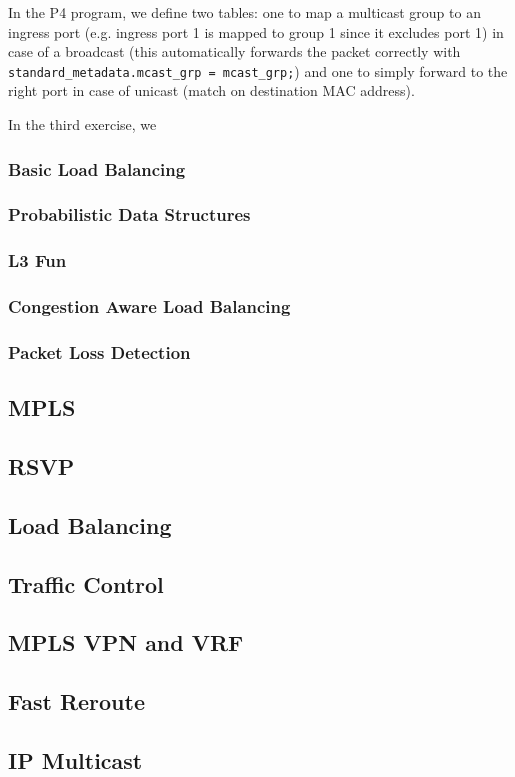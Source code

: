 In the P4 program, we define two tables: one to map a multicast group to an ingress port (e.g. ingress port 1 is mapped to group 1 since it excludes port 1) in case of a broadcast (this automatically forwards the packet correctly with \texttt{standard\_metadata.mcast\_grp = mcast\_grp;}) and one to simply forward to the right port in case of unicast (match on destination MAC address).

In the third exercise, we %


\subsubsection{Basic Load Balancing}



\subsubsection{Probabilistic Data Structures}

\subsubsection{L3 Fun}

\subsubsection{Congestion Aware Load Balancing}

\subsubsection{Packet Loss Detection}



\subsection{MPLS}

\subsection{RSVP}

\subsection{Load Balancing}

\subsection{Traffic Control}

\subsection{MPLS VPN and VRF}

\subsection{Fast Reroute}

\subsection{IP Multicast}